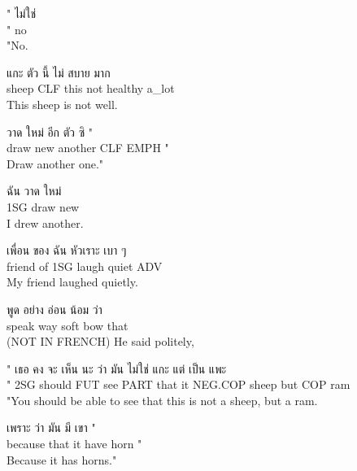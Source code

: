 \documentclass{book}
\begin{document}
	\begin{exe}
		\ex 
		\gll " ไม่ใช่\\
		" no\\
		"No.
	\end{exe}

	\begin{exe}
		\ex 
		\gll แกะ ตัว นี้ ไม่ สบาย มาก\\
		sheep \textsc{CLF} this not healthy a\_lot\\
		This sheep is not well.
	\end{exe}

	\begin{exe}
		\ex 
		\gll วาด ใหม่ อีก ตัว ซิ "\\
		draw new another \textsc{CLF} \textsc{EMPH} "\\
		Draw another one."
	\end{exe}

	\begin{exe}
		\ex 
		\gll ฉัน วาด ใหม่\\
		\textsc{1SG} draw new\\
		I drew another.
	\end{exe}

	\begin{exe}
		\ex 
		\gll เพื่อน ของ ฉัน หัวเราะ เบา ๆ\\
		friend of \textsc{1SG} laugh quiet \textsc{ADV}\\
		My friend laughed quietly.
	\end{exe}

	\begin{exe}
		\ex 
		\gll พูด อย่าง อ่อน น้อม ว่า\\
		speak way soft bow that\\
		(NOT IN FRENCH) He said politely,
	\end{exe}

	\begin{exe}
		\ex 
		\gll " เธอ คง จะ เห็น นะ ว่า มัน ไม่ใช่ แกะ แต่ เป็น แพะ\\
		" \textsc{2SG} should \textsc{FUT} see \textsc{PART} that it \textsc{NEG}.\textsc{COP} sheep but \textsc{COP} ram\\
		"You should be able to see that this is not a sheep, but a ram.
	\end{exe}

	\begin{exe}
		\ex 
		\gll เพราะ ว่า มัน มี เขา "\\
		because that it have horn "\\
		Because it has horns."
	\end{exe}
\end{document}
